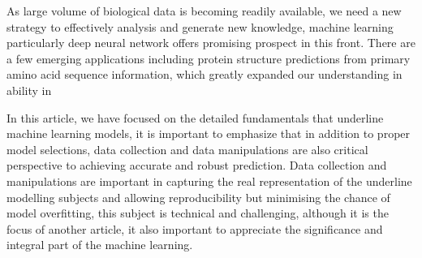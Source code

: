 As large volume of biological data is becoming readily available, we need a new strategy to effectively analysis and generate new knowledge, machine learning particularly deep neural network offers promising prospect in this front. There are a few emerging applications including protein structure predictions from primary amino acid sequence information, which greatly expanded our understanding in ability in 
\par
In this article, we have focused on the detailed fundamentals that underline machine learning models, it is important to emphasize that in addition to proper model selections, data collection and data manipulations are also critical perspective to achieving accurate and robust prediction. Data collection and manipulations are important in capturing the real representation of the underline modelling subjects and allowing reproducibility but minimising the chance of model overfitting, this subject is technical and challenging, although it is the focus of another article, it also important to appreciate the significance and integral part of the machine learning. 
\par 
